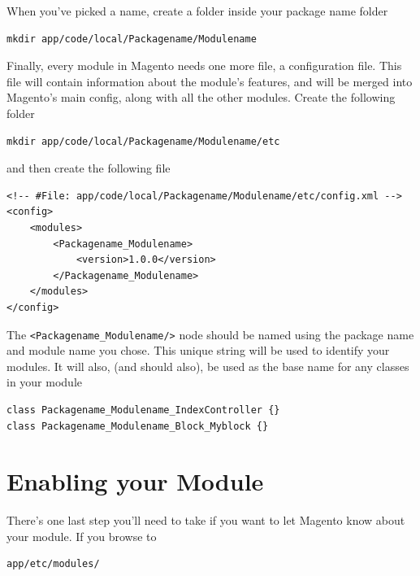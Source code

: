 \documentclass[oneside]{book}
\begin{document}
When you've picked a name, create a folder inside your package name folder

\begin{lstlisting}
mkdir app/code/local/Packagename/Modulename

\end{lstlisting}


Finally, every module in Magento needs one more file, a configuration file. This file will contain information about the module's features, and will be merged into Magento's main config, along with all the other modules.  Create the following folder

\begin{lstlisting}
mkdir app/code/local/Packagename/Modulename/etc

\end{lstlisting}


and then create the following file

\begin{lstlisting}
<!-- #File: app/code/local/Packagename/Modulename/etc/config.xml -->
<config>
    <modules>
        <Packagename_Modulename>
            <version>1.0.0</version>
        </Packagename_Modulename>
    </modules>
</config>

\end{lstlisting}


The \footnotesize\texttt{\textless Packagename\_Modulename/\textgreater } \normalsize  node should be named using the package name and module name you chose.  This unique string will be used to identify your modules.  It will also, (and should also), be used as the base name for any classes in your module

\begin{lstlisting}
class Packagename_Modulename_IndexController {}
class Packagename_Modulename_Block_Myblock {}

\end{lstlisting}


\section{Enabling your Module}

There's one last step you'll need to take if you want to let Magento know about your module.  If you browse to

\begin{lstlisting}
app/etc/modules/

\end{lstlisting}
\end{document}
